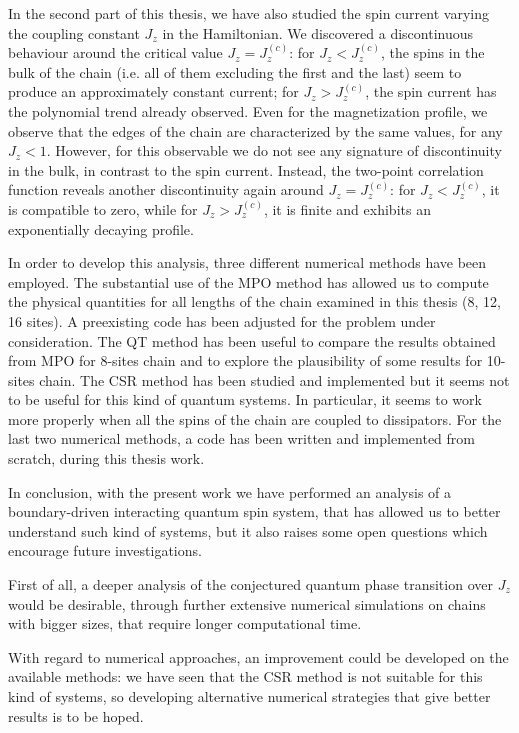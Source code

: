 In the second part of this thesis, we have also studied the spin current varying the coupling constant $J_z$ in the Hamiltonian. We discovered a discontinuous behaviour around the critical value $J_z = J_z^{(c)}$: for $J_z < J_z^{(c)}$, %
the spins in the bulk of the chain (i.e. all of them excluding the first and the last) seem to produce an approximately constant current; for $J_z > J_z^{(c)}$, the spin current has the polynomial trend already observed. Even for the magnetization profile, we observe that the edges of the chain are characterized by the same values, for any $J_z<1$. However, for this observable we do not see any signature of discontinuity in the bulk, in contrast to the spin current. Instead, the two-point correlation function reveals another discontinuity again around $J_z = J_z^{(c)}$: for $J_z < J_z^{(c)}$, it is compatible to zero, while for $J_z > J_z^{(c)}$, it is finite and exhibits an exponentially decaying profile.

In order to develop this analysis, three different numerical methods have been employed.  The substantial use of the MPO method has allowed us to compute the physical quantities for all lengths of the chain examined in this thesis (8, 12, 16 sites). A preexisting code has been adjusted for the problem under consideration. The QT method has been useful to compare the results obtained from MPO for 8-sites chain and to explore the plausibility of some results for 10-sites chain. The CSR method has been studied and implemented but it seems not to be useful for this kind of quantum systems. In particular, it seems to work more properly when all the spins of the chain are coupled to dissipators. For the last two numerical methods, a code has been written and implemented from scratch, during this thesis work.

In conclusion, with the present work we have performed an analysis of a boundary-driven interacting quantum spin system, that
has allowed us to better understand such kind of systems, but it also raises some open questions which encourage future investigations.

First of all, a deeper analysis of the conjectured quantum phase transition over $J_z$ would be desirable, through further extensive numerical simulations on chains with bigger sizes, that require longer computational time.

With regard to numerical approaches, an improvement could be developed on the available methods: we have seen that the CSR method is not suitable for this kind of systems, so developing alternative numerical strategies that give better results is to be hoped.

